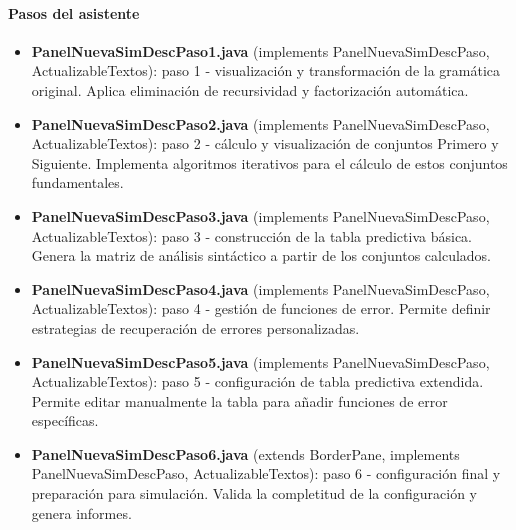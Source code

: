 \paragraph{Pasos del asistente}
\begin{itemize}
    \item \textbf{PanelNuevaSimDescPaso1.java} (implements PanelNuevaSimDescPaso, ActualizableTextos): paso 1 - visualización y transformación de la gramática original. Aplica eliminación de recursividad y factorización automática.

    \item \textbf{PanelNuevaSimDescPaso2.java} (implements PanelNuevaSimDescPaso, ActualizableTextos): paso 2 - cálculo y visualización de conjuntos Primero y Siguiente. Implementa algoritmos iterativos para el cálculo de estos conjuntos fundamentales.

    \item \textbf{PanelNuevaSimDescPaso3.java} (implements PanelNuevaSimDescPaso, ActualizableTextos): paso 3 - construcción de la tabla predictiva básica. Genera la matriz de análisis sintáctico a partir de los conjuntos calculados.

    \item \textbf{PanelNuevaSimDescPaso4.java} (implements PanelNuevaSimDescPaso, ActualizableTextos): paso 4 - gestión de funciones de error. Permite definir estrategias de recuperación de errores personalizadas.

    \item \textbf{PanelNuevaSimDescPaso5.java} (implements PanelNuevaSimDescPaso, ActualizableTextos): paso 5 - configuración de tabla predictiva extendida. Permite editar manualmente la tabla para añadir funciones de error específicas.

    \item \textbf{PanelNuevaSimDescPaso6.java} (extends BorderPane, implements PanelNuevaSimDescPaso, ActualizableTextos): paso 6 - configuración final y preparación para simulación. Valida la completitud de la configuración y genera informes.
\end{itemize}

